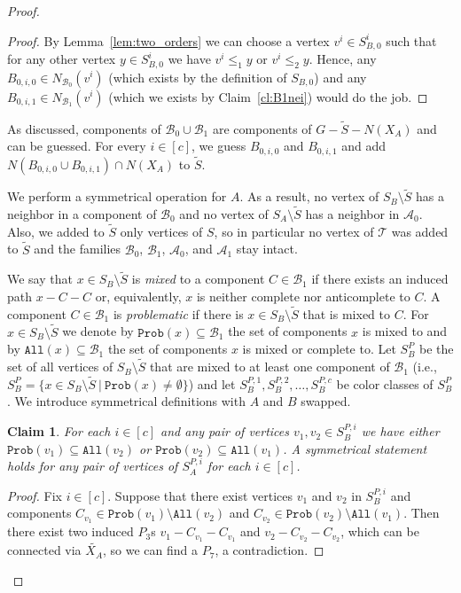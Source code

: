 \documentclass[11pt,a4paper]{article}
\newtheorem{claim}[theorem]{Claim}
\theoremstyle{definition}
\def\T{\mathcal{T}}
\begin{document}
\begin{proof}
\begin{proof}
    By Lemma~\ref{lem:two_orders} we can choose a vertex $v^i \in S_{B,0}^i$ such that for any other vertex $y\in S_{B,0}^i$ we have $v^{i}\leq_1 y$ or $v^{i}\leq_2 y$.
    Hence, any $B_{0,i,0} \in N_{\mathcal{B}_0}(v^i)$ (which exists by the definition of $S_{B,0}$) 
    and any $B_{0,i,1} \in N_{\mathcal{B}_1}(v^i)$ (which we exists by Claim~\ref{cl:B1nei})
    would do the job.
\end{proof}
As discussed, components of $\mathcal{B}_0 \cup \mathcal{B}_1$ are components
of $G-\widetilde{S}-N(X_A)$ and can be guessed.
For every $i \in [c]$, we guess $B_{0,i,0}$ and $B_{0,i,1}$ and add
$N(B_{0,i,0} \cup B_{0,i,1}) \cap N(X_A)$ to $\widetilde{S}$.

We perform a symmetrical operation for $A$. 
As a result, no vertex of $S_B \setminus \widetilde{S}$ has a neighbor in a component
of $\mathcal{B}_0$ and no vertex of $S_A \setminus \widetilde{S}$ has a neighbor in 
$\mathcal{A}_0$. Also, we added to $\widetilde{S}$ only vertices of $S$,
so in particular no vertex of $\T$ was added to $\widetilde{S}$
and the families $\mathcal{B}_0$, $\mathcal{B}_1$, $\mathcal{A}_0$, and $\mathcal{A}_1$ stay
intact. 

We say that $x \in S_B \setminus \widetilde{S}$ is \emph{mixed} to 
a component $C \in \mathcal{B}_1$ if there exists an induced path $x-C-C$ or, equivalently,
$x$ is neither complete nor anticomplete to $C$. 
A component $C \in \mathcal{B}_1$ is \emph{problematic} if there is $x \in S_B \setminus \widetilde{S}$ that is mixed to $C$. 
For $x \in S_B \setminus \widetilde{S}$ we denote by $\texttt{Prob}(x) \subseteq \mathcal{B}_1$
the set of components $x$ is mixed to
and by $\texttt{All}(x) \subseteq \mathcal{B}_1$ the set of components $x$ is mixed or complete to.
Let $S_B^P$ be the set of all vertices of $S_B \setminus \widetilde{S}$
that are mixed to at least one component of $\mathcal{B}_1$
(i.e., $S_B^P = \{x \in S_B \setminus \widetilde{S}~|~\texttt{Prob}(x) \neq \emptyset\}$)
and let $S_B^{P,1},S_B^{P,2},\ldots,S_B^{P,c}$ be color classes of $S_B^P$. 
We introduce symmetrical definitions with $A$ and $B$ swapped. 

\begin{claim}\label{cl:problematic_are_a_subset_of_all}
For each $i\in[c]$ and any pair of vertices $v_1, v_2\in S_B^{P,i}$ we have either $\texttt{Prob}(v_1)\subseteq \texttt{All}(v_2)$ or $\texttt{Prob}(v_2)\subseteq \texttt{All}(v_1)$. A symmetrical statement holds for any pair of vertices of $S_A^{P,i}$ for each $i\in[c]$.
\end{claim}
\begin{proof}
   Fix $i\in [c]$. Suppose that there exist vertices $v_1$ and $v_2$ in $S_B^{P,i}$ and components $C_{v_1}\in \texttt{Prob}(v_1)\setminus \texttt{All}(v_2)$ and $C_{v_2}\in \texttt{Prob}(v_2)\setminus \texttt{All}(v_1)$. Then there exist two induced $P_3$s $v_1-C_{v_1}-C_{v_1}$ and $v_2-C_{v_2}-C_{v_2}$, which can be connected via $\widetilde{X_A}$, so we can find a $P_7$, a contradiction.  
\end{proof}



\end{proof}
\end{document}

